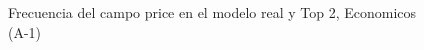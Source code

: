 \begin{figure}[H]
    \centering
    
    \caption{Frecuencia del campo  price en el modelo real y Top 2, Economicos (A-1)}
    \label{frecuency- Price-top2}
\end{figure}